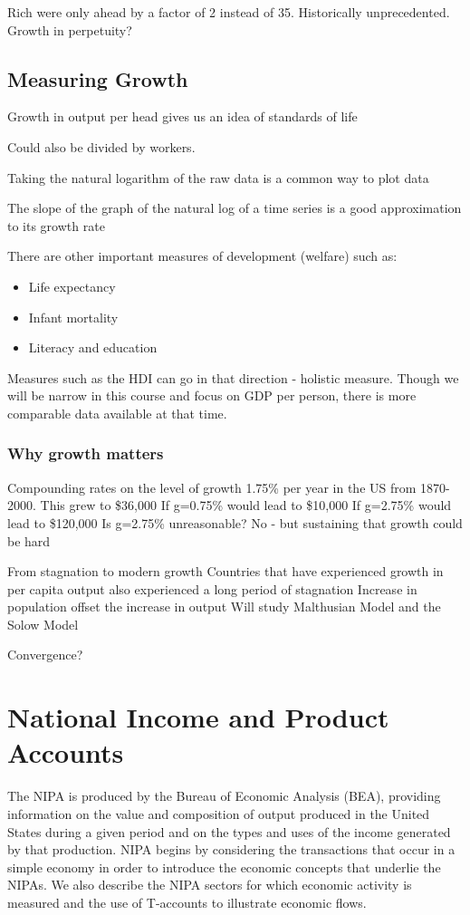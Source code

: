 \documentclass[12pt, letterpaper]{article}
\begin{document}
{Rich were only ahead by a factor of 2 instead of 35. Historically unprecedented. Growth in perpetuity?

\subsection{Measuring Growth}
Growth in output per head gives us an idea of standards of life

Could also be divided by workers.

Taking the natural logarithm of the raw data is a common way to plot data

The slope of the graph of the natural log of a time series is a good approximation to its growth rate

There are other important measures of development (welfare) such as:
\begin{itemize}
	\item Life expectancy
	\item Infant mortality
	\item Literacy and education
\end{itemize}
Measures such as the HDI can go in that direction - holistic measure. Though we will be narrow in this course and focus on GDP per person, there is more comparable data available at that time.

\subsubsection{Why growth matters}
Compounding rates on the level of growth
1.75\% per year in the US from 1870-2000. This grew to \$36,000
If g=0.75\% would lead to \$10,000
If g=2.75\% would lead to \$120,000
Is g=2.75\% unreasonable? No - but sustaining that growth could be hard

From stagnation to modern growth
Countries that have experienced growth in per capita output also experienced a long period of stagnation
Increase in population offset the increase in output
Will study Malthusian Model and the Solow Model

Convergence?


\newpage
\appendix

\section{National Income and Product Accounts}
The NIPA is produced by the Bureau of Economic Analysis (BEA), providing information on the value and composition of output produced in the United States during a given period and on the types and uses of the income generated by that production. NIPA begins by considering the transactions that occur in a simple economy in order to introduce the economic concepts that underlie the NIPAs. We also describe the NIPA sectors for which economic activity is measured and the use of T-accounts to illustrate economic flows.

}
\end{document}
